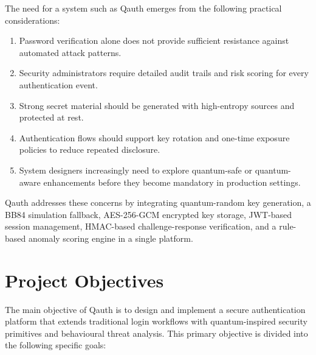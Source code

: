 The need for a system such as Qauth emerges from the following practical considerations:

\begin{enumerate}
    \item Password verification alone does not provide sufficient resistance against automated attack patterns.
    \item Security administrators require detailed audit trails and risk scoring for every authentication event.
    \item Strong secret material should be generated with high-entropy sources and protected at rest.
    \item Authentication flows should support key rotation and one-time exposure policies to reduce repeated disclosure.
    \item System designers increasingly need to explore quantum-safe or quantum-aware enhancements before they become mandatory in production settings.
\end{enumerate}

Qauth addresses these concerns by integrating quantum-random key generation, a BB84 simulation fallback, AES-256-GCM encrypted key storage, JWT-based session management, HMAC-based challenge-response verification, and a rule-based anomaly scoring engine in a single platform.

\section{Project Objectives}
The main objective of Qauth is to design and implement a secure authentication platform that extends traditional login workflows with quantum-inspired security primitives and behavioural threat analysis. This primary objective is divided into the following specific goals:

